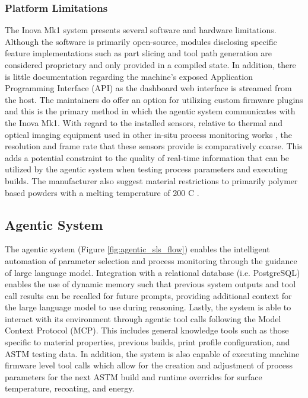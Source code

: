 \subsubsection{Platform Limitations}
The Inova Mk1 system presents several software and hardware limitations.
Although the software is primarily open-source, modules disclosing specific
feature implementations such as part slicing and tool path generation are
considered proprietary and only provided in a compiled state. In addition, there
is little documentation regarding the machine's exposed Application Programming
Interface (API) as the dashboard web interface is streamed from the host. The
maintainers do offer an option for utilizing custom firmware plugins and this is
the primary method in which the agentic system communicates with the Inova Mk1.
With regard to the installed sensors, relative to thermal and optical imaging
equipment used in other in-situ process monitoring works
\cite{myers_high-resolution_2023, myers_two-color_2023, pak_thermopore_2024,
bostan_accurate_2025, ogoke_deep_2024}, the resolution and frame rate that these
sensors provide is comparatively coarse. This adds a potential constraint to the
quality of real-time information that can be utilized by the agentic system when
testing process parameters and executing builds. The manufacturer also suggest
material restrictions to primarily polymer based powders with a melting
temperature of 200 \textdegree C \cite{starek_sls4all_2020}.

\subsection{Agentic System}
The agentic system (Figure \ref{fig:agentic_sls_flow}) enables the intelligent
automation of parameter selection and process monitoring through the guidance of
large language model. Integration with a relational database (i.e. PostgreSQL)
enables the use of dynamic memory such that previous system outputs and tool
call results can be recalled for future prompts, providing additional context
for the large language model to use during reasoning. Lastly, the system is able
to interact with its environment through agentic tool calls following the Model
Context Protocol (MCP). This includes general knowledge tools such as those
specific to material properties, previous builds, print profile configuration,
and ASTM testing data. In addition, the system is also capable of executing
machine firmware level tool calls which allow for the creation and adjustment of
process parameters for the next ASTM build and runtime overrides for surface
temperature, recoating, and energy.

